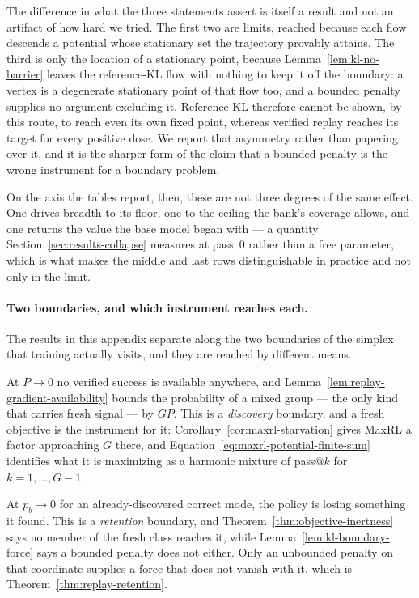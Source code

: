 \documentclass{article}
\newcommand{\1}{\mathbf 1}
\theoremstyle{remark}
\theoremstyle{definition}
\theoremstyle{plain}
\begin{document}
The difference in what the three statements assert is itself a result and not
an artifact of how hard we tried. The first two are limits, reached because
each flow descends a potential whose stationary set the trajectory provably
attains. The third is only the location of a stationary point, because
Lemma~\ref{lem:kl-no-barrier} leaves the reference-KL flow with nothing to
keep it off the boundary: a vertex is a degenerate stationary point of that
flow too, and a bounded penalty supplies no argument excluding it. Reference KL
therefore cannot be shown, by this route, to reach even its own fixed point,
whereas verified replay reaches its target for every positive dose. We report
that asymmetry rather than papering over it, and it is the sharper form of the
claim that a bounded penalty is the wrong instrument for a boundary problem.

On the axis the tables report, then, these are not three degrees of the same
effect. One drives breadth to its floor, one to the ceiling the bank's coverage
allows, and one returns the value the base model began with --- a quantity
Section~\ref{sec:results-collapse} measures at pass~0 rather than a free
parameter, which is what makes the middle and last rows distinguishable in
practice and not only in the limit.

\paragraph{Two boundaries, and which instrument reaches each.}
The results in this appendix separate along the two boundaries of the simplex
that training actually visits, and they are reached by different means.

At $P\to0$ no verified success is available anywhere, and
Lemma~\ref{lem:replay-gradient-availability} bounds the probability of a
mixed group --- the only kind that carries fresh signal --- by $GP$. This is a
\emph{discovery} boundary, and a fresh objective is the instrument for it:
Corollary~\ref{cor:maxrl-starvation} gives MaxRL a factor approaching $G$
there, and Equation~\eqref{eq:maxrl-potential-finite-sum} identifies what it
is maximizing as a harmonic mixture of pass@$k$ for $k=1,\ldots,G-1$.

At $p_b\to0$ for an already-discovered correct mode, the policy is losing
something it found. This is a \emph{retention} boundary, and
Theorem~\ref{thm:objective-inertness} says no member of the fresh class
reaches it, while Lemma~\ref{lem:kl-boundary-force} says a bounded penalty
does not either. Only an unbounded penalty on that coordinate supplies a force
that does not vanish with it, which is Theorem~\ref{thm:replay-retention}.
\end{document}
